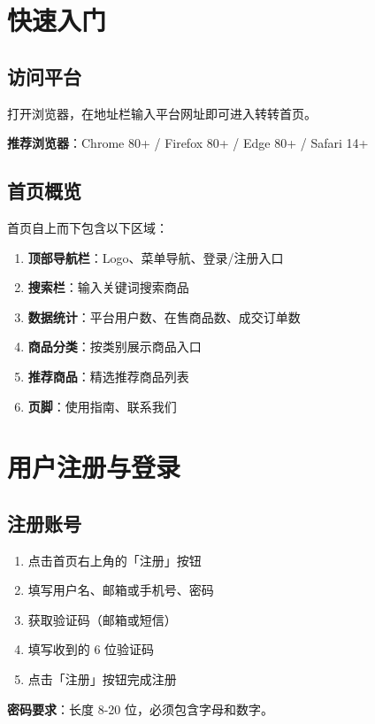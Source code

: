 \documentclass[12pt,a4paper,UTF8]{ctexart}
\begin{document}
\section{快速入门}

\subsection{访问平台}

打开浏览器，在地址栏输入平台网址即可进入转转首页。

\textbf{推荐浏览器}：Chrome 80+ / Firefox 80+ / Edge 80+ / Safari 14+

\subsection{首页概览}

首页自上而下包含以下区域：
\begin{enumerate}
    \item \textbf{顶部导航栏}：Logo、菜单导航、登录/注册入口
    \item \textbf{搜索栏}：输入关键词搜索商品
    \item \textbf{数据统计}：平台用户数、在售商品数、成交订单数
    \item \textbf{商品分类}：按类别展示商品入口
    \item \textbf{推荐商品}：精选推荐商品列表
    \item \textbf{页脚}：使用指南、联系我们
\end{enumerate}

\section{用户注册与登录}

\subsection{注册账号}

\begin{enumerate}
    \item 点击首页右上角的「注册」按钮
    \item 填写用户名、邮箱或手机号、密码
    \item 获取验证码（邮箱或短信）
    \item 填写收到的 6 位验证码
    \item 点击「注册」按钮完成注册
\end{enumerate}

\textbf{密码要求}：长度 8-20 位，必须包含字母和数字。
\end{document}
